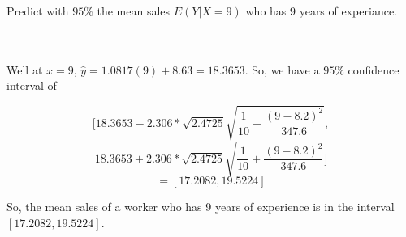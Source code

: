 Predict with $95\%$ the mean sales $E(Y|X=9)$ who has 9 years of experiance.\\\\

\begin{solution}\renewcommand{\qedsymbol}{}\ \\
    Well at $x=9$, $\hat{y}=1.0817(9)+8.63=18.3653$. So, we have a $95\%$ confidence interval of

    $$[18.3653-2.306*\sqrt{2.4725}\sqrt{\frac{1}{10}+\frac{(9-8.2)^2}{347.6}},$$
    $$18.3653+2.306*\sqrt{2.4725}\sqrt{\frac{1}{10}+\frac{(9-8.2)^2}{347.6}}]$$
    $$=[17.2082, 19.5224]$$
    
    So, the mean sales of a worker who has 9 years of experience is in the interval $[17.2082,19.5224]$.

\end{solution}
